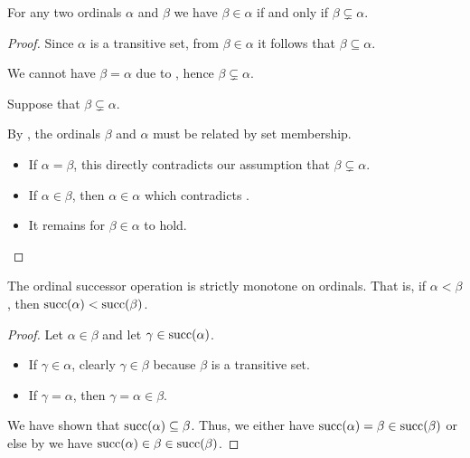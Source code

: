 \begin{proposition}\label{thm:ordinal_ordering_via_subsets}
  For any two ordinals \( \alpha \) and \( \beta \) we have \( \beta \in \alpha \) if and only if \( \beta \subsetneq \alpha \).
\end{proposition}
\begin{proof}
  \NecessitySubProof Since \( \alpha \) is a transitive set, from \( \beta \in \alpha \) it follows that \( \beta \subseteq \alpha \).

  We cannot have \( \beta = \alpha \) due to , hence \( \beta \subsetneq \alpha \).

  \SufficiencySubProof Suppose that \( \beta \subsetneq \alpha \).

  By , the ordinals \( \beta \) and \( \alpha \) must be related by set membership.
  \begin{itemize}
    \item If \( \alpha = \beta \), this directly contradicts our assumption that \( \beta \subsetneq \alpha \).
    \item If \( \alpha \in \beta \), then \( \alpha \in \alpha \) which contradicts .
    \item It remains for \( \beta \in \alpha \) to hold.
  \end{itemize}
\end{proof}

\begin{proposition}\label{thm:ordinal_successor_strictly_monotone_on_ordinals}
  The ordinal successor operation is strictly monotone on ordinals. That is, if \( \alpha < \beta \), then \( \operatorname{succ}(\alpha) < \operatorname{succ}(\beta) \).
\end{proposition}
\begin{proof}
  Let \( \alpha \in \beta \) and let \( \gamma \in \operatorname{succ}(\alpha) \).
  \begin{itemize}
    \item If \( \gamma \in \alpha \), clearly \( \gamma \in \beta \) because \( \beta \) is a transitive set.

    \item If \( \gamma = \alpha \), then \( \gamma = \alpha \in \beta \).
  \end{itemize}

  We have shown that \( \operatorname{succ}(\alpha) \subseteq \beta \). Thus, we either have \( \operatorname{succ}(\alpha) = \beta \in \operatorname{succ}(\beta) \) or else by  we have \( \operatorname{succ}(\alpha) \in \beta \in \operatorname{succ}(\beta) \).
\end{proof}


